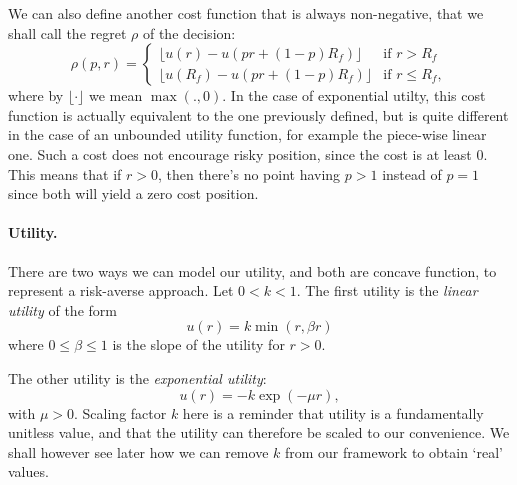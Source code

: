 We can also define another cost function that is always non-negative, that we shall call the
regret $\rho$ of the decision:
\begin{equation*}
  \rho(p,r) =
  \begin{cases}
    \lfloor u(r) - u(pr + (1-p)R_f)\rfloor & \text{if } r>R_f\\
    \lfloor u(R_f) - u(pr + (1-p)R_f)\rfloor &\text{if } r\leq R_f,
  \end{cases}
\end{equation*}
where by $\lfloor \cdot \rfloor$ we mean $\max(.,0)$. In the case of exponential
utilty, this cost function is actually equivalent to the one previously defined, but is
quite different in the case of an unbounded utility function, for example the piece-wise
linear one. Such a cost does not encourage risky position, since the cost is at least
0. This means that if $r>0$, then there's no point having $p>1$ instead of $p=1$ since
both will yield a zero cost position. 

\paragraph{Utility.}
There are two ways we can model our utility, and both are concave function, to represent a
risk-averse approach. Let $0<k<1$. The first utility is the \emph{linear utility} of the form
\begin{equation}
  \label{linearUtility}
  u(r) = k\min(r, \beta r)
\end{equation}
where $0\leq\beta\leq1$ is the slope of the utility for $r>0$. 

The other utility is the \emph{exponential utility}:
\begin{equation}
  \label{expUtility}
  u(r) = -k\exp(-\mu r),
\end{equation}
with $\mu > 0$. Scaling factor $k$ here is a reminder that utility is a fundamentally
unitless value, and that the utility can therefore be scaled to our convenience. We shall
however see later how we can remove $k$ from our framework to obtain `real' values.

